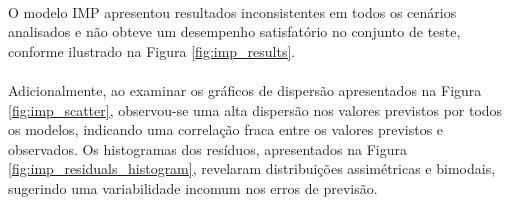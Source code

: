 \paragraph{} O modelo \ac{IMP} apresentou resultados inconsistentes em todos os cenários analisados e não obteve um desempenho satisfatório no conjunto de teste, conforme ilustrado na Figura \ref{fig:imp_results}.
\paragraph{} Adicionalmente, ao examinar os gráficos de dispersão apresentados na Figura \ref{fig:imp_scatter}, observou-se uma alta dispersão nos valores previstos por todos os modelos, indicando uma correlação fraca entre os valores previstos e observados. Os histogramas dos resíduos, apresentados na Figura \ref{fig:imp_residuals_histogram}, revelaram distribuições assimétricas e bimodais, sugerindo uma variabilidade incomum nos erros de previsão.

